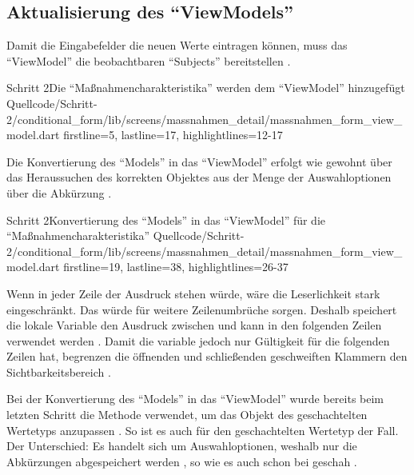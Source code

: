 \subsection{Aktualisierung des \enquote{ViewModels}}

Damit die Eingabefelder die neuen Werte eintragen können, muss das \enquote{ViewModel} die beobachtbaren \enquote{Subjects} bereitstellen .

\begin{alexlisting}{Schritt 2}{Die \enquote{Maßnahmencharakteristika} werden dem \enquote{ViewModel} hinzugefügt}
  {Quellcode/Schritt-2/conditional_form/lib/screens/massnahmen_detail/massnahmen_form_view_model.dart}
  {firstline=5, lastline=17, highlightlines={12-17}}
  \label{lst:Schritt2MassnahmencharakteristikaWerdenDemViewModelHinzugefuegt}
\end{alexlisting}


Die Konvertierung des \enquote{Models} in das \enquote{ViewModel} erfolgt wie gewohnt über das Heraussuchen des korrekten Objektes aus der Menge der Auswahloptionen über die Abkürzung .

\begin{alexlisting}{Schritt 2}{Konvertierung des \enquote{Models} in das \enquote{ViewModel} für die \enquote{Maßnahmencharakteristika}}
  {Quellcode/Schritt-2/conditional_form/lib/screens/massnahmen_detail/massnahmen_form_view_model.dart}
  {firstline=19, lastline=38, highlightlines={26-37}}
  \label{lst:Schritt2KonvertierungDesModelsInDasViewModel}
\end{alexlisting}

Wenn in jeder Zeile der Ausdruck  stehen würde, wäre die Leserlichkeit stark eingeschränkt.
Das würde für weitere Zeilenumbrüche sorgen.
Deshalb speichert die lokale Variable  den Ausdruck zwischen und kann in den folgenden Zeilen verwendet werden .
Damit die variable  jedoch nur Gültigkeit für die folgenden Zeilen hat, begrenzen die öffnenden und schließenden geschweiften Klammern den Sichtbarkeitsbereich .

Bei der Konvertierung des \enquote{Models} in das \enquote{ViewModel} wurde bereits beim letzten Schritt die Methode  verwendet,
um das Objekt des geschachtelten Wertetyps  anzupassen .
So ist es auch für den geschachtelten Wertetyp  der Fall.
Der Unterschied: Es handelt sich um Auswahloptionen, weshalb nur die Abkürzungen abgespeichert werden , so wie es auch schon bei  geschah .

